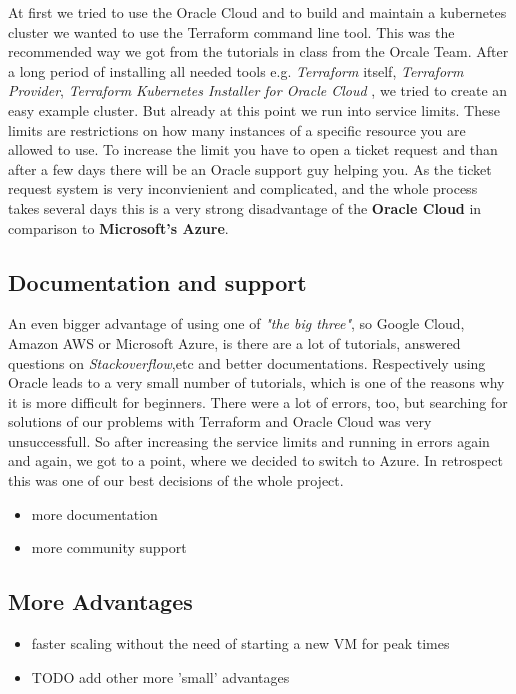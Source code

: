 \documentclass[conference]{IEEEtran}
\begin{document}
At first we tried to use the Oracle Cloud and to build and maintain a kubernetes cluster we wanted to use the Terraform command
line tool. This was the recommended way we got from the tutorials in class from the Orcale Team.
After a long period of installing all needed tools e.g. \textit{Terraform} itself, \textit{Terraform Provider},
\textit{Terraform Kubernetes Installer for Oracle Cloud} \cite{TerrafromK8sInstaller}, we tried to create an easy example cluster.
But already at this point we run into service limits. These limits are restrictions on how many instances of a specific resource you are
allowed to use. To increase the limit you have to open a ticket request and than after a few days there will be an Oracle support guy
helping you. As the ticket request system is very inconvienient and complicated, and the whole process takes several days this is a very strong
disadvantage of the \textbf{Oracle Cloud} in comparison to \textbf{Microsoft's Azure}.

\subsection{Documentation and support}
An even bigger advantage of using one of \textit{"the big three"}, so Google Cloud, Amazon AWS or Microsoft Azure, is there are
a lot of tutorials, answered questions on \textit{Stackoverflow},etc and better documentations. Respectively using Oracle leads to
a very small number of tutorials, which is one of the reasons why it is more difficult for beginners. There were a lot of errors, too,
but searching for solutions of our problems with Terraform and Oracle Cloud was very unsuccessfull.
So after increasing the service limits and running in errors again and again, we got to a point, where we decided to switch to Azure.
In retrospect this was one of our best decisions of the whole project.
 
\begin{itemize}
	\item more documentation
	\item more community support
\end{itemize}

\subsection{More Advantages}
\begin{itemize}
	\item faster scaling without the need of starting a new VM for peak times
	\item TODO add other more 'small' advantages
\end{itemize}
\end{document}
